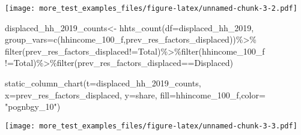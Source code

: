 \documentclass[
]{article}
\newenvironment{Shaded}{\begin{snugshade}}{\end{snugshade}}
\newcommand{\AttributeTok}[1]{\textcolor[rgb]{0.77,0.63,0.00}{#1}}
\newcommand{\FunctionTok}[1]{\textcolor[rgb]{0.00,0.00,0.00}{#1}}
\newcommand{\NormalTok}[1]{#1}
\newcommand{\OtherTok}[1]{\textcolor[rgb]{0.56,0.35,0.01}{#1}}
\newcommand{\SpecialCharTok}[1]{\textcolor[rgb]{0.00,0.00,0.00}{#1}}
\newcommand{\StringTok}[1]{\textcolor[rgb]{0.31,0.60,0.02}{#1}}
\begin{document}
\texttt{[image: more\_test\_examples\_files/figure-latex/unnamed-chunk-3-2.pdf]}

\begin{Shaded}
\begin{Highlighting}[]
\NormalTok{displaced\_hh\_2019\_counts}\OtherTok{\textless{}{-}} \FunctionTok{hhts\_count}\NormalTok{(}\AttributeTok{df=}\NormalTok{displaced\_hh\_2019, }\AttributeTok{group\_vars=}\FunctionTok{c}\NormalTok{(}\StringTok{\textquotesingle{}hhincome\_100\_f\textquotesingle{}}\NormalTok{,}\StringTok{\textquotesingle{}prev\_res\_factors\_displaced\textquotesingle{}}\NormalTok{))}\SpecialCharTok{\%\textgreater{}\%}
\FunctionTok{filter}\NormalTok{(prev\_res\_factors\_displaced}\SpecialCharTok{!=}\StringTok{\textquotesingle{}Total\textquotesingle{}}\NormalTok{)}\SpecialCharTok{\%\textgreater{}\%}\FunctionTok{filter}\NormalTok{(hhincome\_100\_f }\SpecialCharTok{!=}\StringTok{\textquotesingle{}Total\textquotesingle{}}\NormalTok{)}\SpecialCharTok{\%\textgreater{}\%}\FunctionTok{filter}\NormalTok{(prev\_res\_factors\_displaced}\SpecialCharTok{==}\StringTok{\textquotesingle{}Displaced\textquotesingle{}}\NormalTok{)}

\FunctionTok{static\_column\_chart}\NormalTok{(}\AttributeTok{t=}\NormalTok{displaced\_hh\_2019\_counts, }\AttributeTok{x=}\StringTok{\textquotesingle{}prev\_res\_factors\_displaced\textquotesingle{}}\NormalTok{, }\AttributeTok{y=}\StringTok{\textquotesingle{}share\textquotesingle{}}\NormalTok{, }\AttributeTok{fill=}\StringTok{\textquotesingle{}hhincome\_100\_f\textquotesingle{}}\NormalTok{,}\AttributeTok{color=}  \StringTok{"pognbgy\_10"}\NormalTok{)}
\end{Highlighting}
\end{Shaded}

\texttt{[image: more\_test\_examples\_files/figure-latex/unnamed-chunk-3-3.pdf]}
\end{document}

